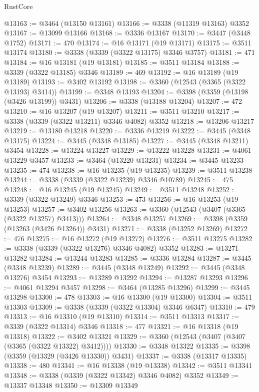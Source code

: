 \begin{lexlean}{RustCore}
\begin{coremodule}
@13163 := @3464 (@13150 @13161)
@13166 := @3338 (@11319 @13163) @3352
@13167 := @13099 @13166
@13168 := @3336 @13167
@13170 := @3447 (@3448 @1752)
@13171 := 470
@13174 := @16 @13171 (@19 @13171)
@13175 := @3511 @13174
@13180 := @3338 (@3339 (@3322 @13175) @3346 @3757)
@13181 := 471
@13184 := @16 @13181 (@19 @13181)
@13185 := @3511 @13184
@13188 := @3339 (@3322 @13185) @3346
@13189 := 469
@13192 := @16 @13189 (@19 @13189)
@13193 := @3402 @13192
@13198 := @3360 (@12543 (@3365 (@3322 @13193) @3414))
@13199 := @3348 @13193
@13204 := @3398 (@3359 (@13198 (@3426 @13199)) @3431)
@13206 := @3338 (@13188 @13204)
@13207 := 472
@13210 := @16 @13207 (@19 @13207)
@13211 := @3511 @13210
@13217 := @3338 (@3339 (@3322 @13211) @3346 @4082) @3352
@13218 := @13206 @13217
@13219 := @13180 @13218
@13220 := @3336 @13219
@13222 := @3445 (@3348 @13175)
@13224 := @3445 (@3348 @13185)
@13227 := @3445 (@3348 @13211) @3454
@13228 := @13224 @13227
@13229 := @13222 @13228
@13231 := @4061 @13229 @3457
@13233 := @3464 (@13220 @13231)
@13234 := @3445 @13233
@13235 := 474
@13238 := @16 @13235 (@19 @13235)
@13239 := @3511 @13238
@13244 := @3338 (@3339 (@3322 @13239) @3346 @10789)
@13245 := 475
@13248 := @16 @13245 (@19 @13245)
@13249 := @3511 @13248
@13252 := @3339 (@3322 @13249) @3346
@13253 := 473
@13256 := @16 @13253 (@19 @13253)
@13257 := @3402 @13256
@13263 := @3360 (@12543 (@3407 (@3365 (@3322 @13257) @3413)))
@13264 := @3348 @13257
@13269 := @3398 (@3359 (@13263 (@3426 @13264)) @3431)
@13271 := @3338 (@13252 @13269)
@13272 := 476
@13275 := @16 @13272 (@19 @13272)
@13276 := @3511 @13275
@13282 := @3338 (@3339 (@3322 @13276) @3346 @4082) @3352
@13283 := @13271 @13282
@13284 := @13244 @13283
@13285 := @3336 @13284
@13287 := @3445 (@3348 @13239)
@13289 := @3445 (@3348 @13249)
@13292 := @3445 (@3348 @13276) @3454
@13293 := @13289 @13292
@13294 := @13287 @13293
@13296 := @4061 @13294 @3457
@13298 := @3464 (@13285 @13296)
@13299 := @3445 @13298
@13300 := 478
@13303 := @16 @13300 (@19 @13300)
@13304 := @3511 @13303
@13309 := @3338 (@3339 (@3322 @13304) @3346 @6347)
@13310 := 479
@13313 := @16 @13310 (@19 @13310)
@13314 := @3511 @13313
@13317 := @3339 (@3322 @13314) @3346
@13318 := 477
@13321 := @16 @13318 (@19 @13318)
@13322 := @3402 @13321
@13329 := @3360 (@12543 (@3407 (@3407 (@3365 (@3322 @13322) @3412))))
@13330 := @3348 @13322
@13335 := @3398 (@3359 (@13329 (@3426 @13330)) @3431)
@13337 := @3338 (@13317 @13335)
@13338 := 480
@13341 := @16 @13338 (@19 @13338)
@13342 := @3511 @13341
@13348 := @3338 (@3339 (@3322 @13342) @3346 @4082) @3352
@13349 := @13337 @13348
@13350 := @13309 @13349

\end{coremodule}
\end{lexlean}

